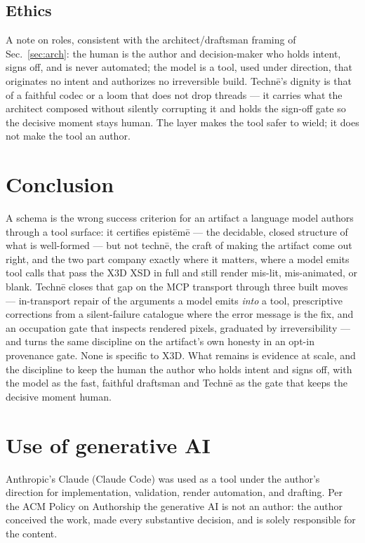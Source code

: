 \documentclass[sigconf,nonacm,screen,anonymous]{acmart}
\begin{document}
\subsection{Ethics}
A note on roles, consistent with the architect/draftsman framing of Sec.~\ref{sec:arch}: the human is the author and decision-maker who holds intent, signs off, and is never automated; the model is a tool, used under direction, that originates no intent and authorizes no irreversible build. Technē's dignity is that of a faithful codec or a loom that does not drop threads --- it carries what the architect composed without silently corrupting it and holds the sign-off gate so the decisive moment stays human. The layer makes the tool safer to wield; it does not make the tool an author.

\section{Conclusion}\label{sec:conclusion}

A schema is the wrong success criterion for an artifact a language model authors through a tool surface: it certifies epistēmē --- the decidable, closed structure of what is well-formed --- but not technē, the craft of making the artifact come out right, and the two part company exactly where it matters, where a model emits tool calls that pass the X3D XSD in full and still render mis-lit, mis-animated, or blank. Technē closes that gap on the MCP transport through three built moves --- in-transport repair of the arguments a model emits \emph{into} a tool, prescriptive corrections from a silent-failure catalogue where the error message is the fix, and an occupation gate that inspects rendered pixels, graduated by irreversibility --- and turns the same discipline on the artifact's own honesty in an opt-in provenance gate. None is specific to X3D. What remains is evidence at scale, and the discipline to keep the human the author who holds intent and signs off, with the model as the fast, faithful draftsman and Technē as the gate that keeps the decisive moment human.

\section*{Use of generative AI}
Anthropic's Claude (Claude Code) was used as a tool under the author's direction
for implementation, validation, render automation, and drafting. Per the ACM Policy
on Authorship the generative AI is not an author: the author conceived the work,
made every substantive decision, and is solely responsible for the content.
\end{document}
